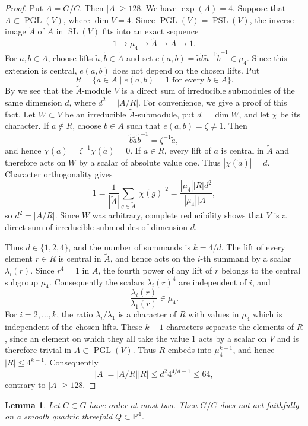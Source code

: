 \documentclass[10pt,oneside,reqno]{amsart}
\numberwithin{equation}{section}
\newtheorem{lemma}[theorem]{Lemma}
\theoremstyle{definition}
\begin{document}
\begin{proof}
Put $A=G/C$.  Then $|A|\geq128$.  We have $\exp(A)=4$.  Suppose that
$A\subset\operatorname{PGL}(V)$, where
$\dim V=4$.  Since $\operatorname{PGL}(V)=\operatorname{PSL}(V)$, the
inverse image $\widetilde A$ of $A$ in $\operatorname{SL}(V)$ fits into
an exact sequence
\[
 1\longrightarrow\mu_4\longrightarrow\widetilde A
 \longrightarrow A\longrightarrow1.
\]
For $a,b\in A$, choose lifts $\widetilde a,\widetilde b\in\widetilde A$
and set
$
 e(a,b)=\widetilde a\widetilde b\widetilde a^{-1}
 \widetilde b^{-1}\in\mu_4.
$
Since this extension is central, $e(a,b)$ does not depend on the
chosen lifts.  Put
\[
 R=\{a\in A\mid e(a,b)=1\text{ for every }b\in A\}.
\]
By \cite[Chapter~8, Theorem~2.21(ii)]{Karpilovsky} we see that the
$\widetilde A$-module $V$ is a direct sum of irreducible submodules of
the same dimension $d$, where
$
 d^2=|A/R|.
$
For convenience, we give a proof of this fact.  Let $W\subset V$ be
an irreducible $\widetilde A$-submodule, put $d=\dim W$, and let $\chi$
be its character.  If $a\notin R$, choose $b\in A$ such that
$e(a,b)=\zeta\ne1$.  Then
\[
 \widetilde b\widetilde a\widetilde b^{-1}
 =\zeta^{-1}\widetilde a,
\]
and hence $\chi(\widetilde a)=\zeta^{-1}\chi(\widetilde a)=0$.
If $a\in R$, every lift of $a$ is central in $\widetilde A$ and
therefore acts on $W$ by a scalar of absolute value one.  Thus
$|\chi(\widetilde a)|=d$.  Character orthogonality gives
\[
 1=\frac{1}{|\widetilde A|}
 \sum_{g\in\widetilde A}|\chi(g)|^2
 =\frac{|\mu_4||R|d^2}{|\mu_4||A|},
\]
so $d^2=|A/R|$.  Since $W$ was arbitrary, complete reducibility shows
that $V$ is a direct sum of irreducible submodules of dimension $d$.

Thus $d\in\{1,2,4\}$, and the number of summands is $k=4/d$.  The
lift of every element $r\in R$ is central in $\widetilde A$, and hence
acts on the $i$-th summand by a scalar $\lambda_i(r)$.  Since $r^4=1$
in $A$, the fourth power of any lift of $r$ belongs to the central
subgroup $\mu_4$.  Consequently the scalars $\lambda_i(r)^4$ are
independent of $i$, and
\[
 \frac{\lambda_i(r)}{\lambda_1(r)}\in\mu_4.
\]
For $i=2,\ldots,k$, the ratio $\lambda_i/\lambda_1$ is a character
of $R$ with values in $\mu_4$ which is independent of the chosen lifts.
These $k-1$ characters separate the elements of $R$, since an element
on which they all take the value $1$ acts by a scalar on $V$ and is
therefore trivial in $A\subset\operatorname{PGL}(V)$.  Thus $R$ embeds
into $\mu_4^{k-1}$, and hence $|R|\leq4^{k-1}$.
Consequently
\[
 |A|=|A/R||R|\leq d^2 4^{4/d-1}\leq64,
\]
contrary to $|A|\geq128$.
\end{proof}
\begin{lemma}
\label{lem-quadric}
Let $C\subset G$ have order at most two.  Then $G/C$ does not act
faithfully on a smooth quadric threefold $Q\subset \mathbb{P}^4$.
\end{lemma}
\end{document}
